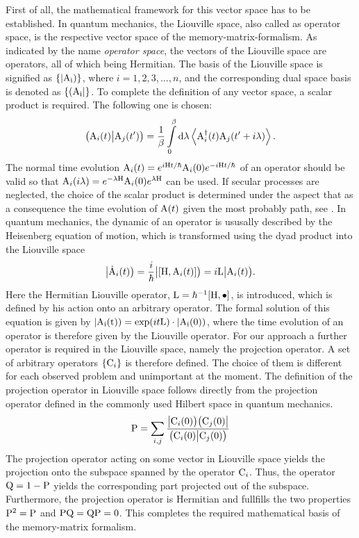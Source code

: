 First of all, the mathematical framework for this vector space has to be established.
In quantum mechanics, the Liouville space, also called as operator space, is the respective vector space of the memory-matrix-formalism.
As indicated by the name \emph{operator space}, the vectors of the Liouville space are operators, all of which being Hermitian.
The basis of the Liouville space is signified as $\{|\mathrm{\mathrm{A}_{i}})\}$, where $i = 1,2,3,\dots,n$, and the corresponding dual space basis is denoted as $\{(\mathrm{\mathrm{A}_{i}}|\}$.
To complete the definition of any vector space, a scalar product is required.
The following one is chosen:
%
\begin{align}
	\big({\mathrm{A}_{i}(t)}\big|{\mathrm{A}_{j}(t')}\big) = \frac{1}{\beta} \int\limits_{0}^{\beta} \dd{\lambda} \expval{\mathrm{A}_{i}^{\dag}(t) \mathrm{A}_{j}(t'+i\lambda)}.
	\label{eq:scalar product Liouville space}
\end{align}
%
The normal time evolution $\mathrm{A}_{i}(t) = e^{i\mathrm{H}t/\hbar} \mathrm{A}_{i}(0) e^{-i\mathrm{H}t/\hbar}$ of an operator should be valid so that $\mathrm{A}_{i}(i\lambda) = e^{-\lambda\mathrm{H}} \mathrm{A}_{i}(0) e^{\lambda\mathrm{H}}$ can be used.
If secular processes are neglected, the choice of the scalar product is determined under the aspect that as a consequence the time evolution of $\mathrm{A}(t)$ given the most probably path, see \cite{Mori}.
In quantum mechanics, the dynamic of an operator is ususally described by the Heisenberg equation of motion, which is transformed using the dyad product into the Liouville space
%
\begin{align}
	\oket{\dot{\mt{A}}_{i}(t)} = \frac{i}{\hbar} \oket{\comm{\mt{H}}{\mt{A}_{i}(t)}} = i \mt{L} \oket{\mt{A}_{i}(t)}.
	\label{eq:HEM in LS}
\end{align}
%
Here the Hermitian Liouville operator, ${\mt{L} = \hbar^{-1} \comm{\mt{H}}{\mt{\bullet}}}$, is introduced, which is defined by his action onto an arbitrary operator.
The formal solution of this equation is given by $|\mathrm{\mathrm{A}_{i}(t)}) = \exp(it\mathrm{L}) \cdot |\mathrm{\mathrm{A}_{i}(0)})$, where the time evolution of an operator is therefore given by the Liouville operator.
For our approach a further operator is required in the Liouville space, namely the projection operator.
A set of arbitrary operators $\{\mathrm{C}_{i}\}$ is therefore defined.
The choice of them is different for each observed problem and unimportant at the moment.
The definition of the projection operator in Liouville space follows directly from the projection operator defined in the commonly used Hilbert space in quantum mechanics.
%
\begin{align}
	\mathrm{P} = \sum\limits_{i,j} \frac{\big|{\mathrm{C}_{i}(0)}\big) \big({\mathrm{C}_{j}(0)}\big|}{\big({\mathrm{C}_{i}(0)}\big|{\mathrm{C}_{j}(0)}\big)} 
	\label{eq:projection operator}
\end{align}
%
The projection operator acting on some vector in Liouville space yields the projection onto the subspace spanned by the operator $\mathrm{C}_{i}$.
Thus, the operator $\mathrm{Q} = 1 - \mathrm{P}$ yields the corresponding part projected out of the subspace.
Furthermore, the projection operator is Hermitian and fullfills the two properties $\mathrm{P}^{2} = \mathrm{P}$ and $\mathrm{PQ} = \mathrm{QP} = 0$.
This completes the required mathematical basis of the memory-matrix formalism.

